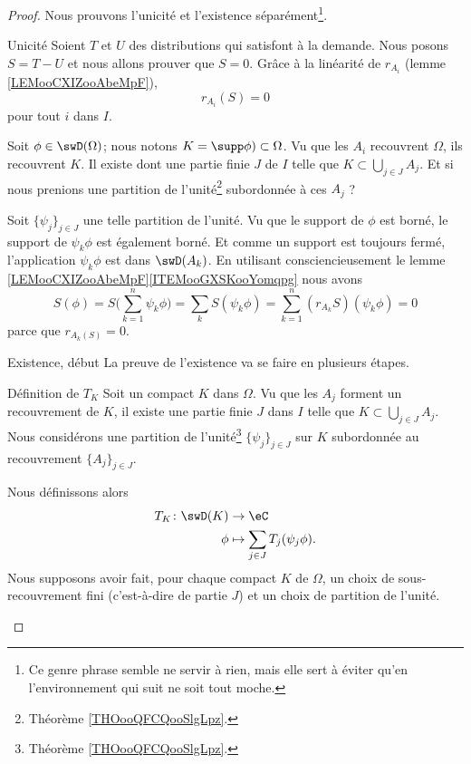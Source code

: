 \begin{proof}
    Nous prouvons l'unicité et l'existence séparément\footnote{Ce genre phrase semble ne servir à rien, mais elle sert à éviter qu'en l'environnement  qui suit ne soit tout moche.}.
    \begin{subproof}
    \item[Unicité]
        Soient \( T\) et \( U\) des distributions qui satisfont à la demande. Nous posons \( S=T-U\) et nous allons prouver que \( S=0\). Grâce à la linéarité de \( r_{A_i}\) (lemme \ref{LEMooCXIZooAbeMpF}),
        \begin{equation}
            r_{A_i}(S)=0
        \end{equation}
        pour tout \( i\) dans \( I\).

        Soit \( \phi\in \swD(\Omega)\); nous notons \( K=\supp\phi)\subset\Omega\). Vu que les \( A_i\) recouvrent \( \Omega\), ils recouvrent \( K\). Il existe dont une partie finie \( J\) de \( I\) telle que \( K\subset\bigcup_{j\in J}A_j\). Et si nous prenions une partition de l'unité\footnote{Théorème \ref{THOooQFCQooSlgLpz}.} subordonnée à ces \( A_j\) ?

        Soit \( \{ \psi_j \}_{j\in J}\) une telle partition de l'unité. Vu que le support de \( \phi\) est borné, le support de \( \psi_k\phi\) est également borné. Et comme un support est toujours fermé, l'application \( \psi_k\phi\) est dans \( \swD(A_k)\). En utilisant consciencieusement le lemme \ref{LEMooCXIZooAbeMpF}\ref{ITEMooGXSKooYomqpg} nous avons
        \begin{equation}
            S(\phi)=S\big( \sum_{k=1}^n\psi_k\phi \big)=\sum_kS(\psi_k\phi)=\sum_{k=1}^n(r_{A_k}S)(\psi_k\phi)=0
        \end{equation}
        parce que \( r_{A_k(S)}=0\).
    \item[Existence, début]
        La preuve de l'existence va se faire en plusieurs étapes.

    \item[Définition de $T_K$]
        Soit un compact \( K\) dans \( \Omega\). Vu que les \( A_j\) forment un recouvrement de \( K\), il existe une partie finie \( J\) dans \( I\) telle que \( K\subset\bigcup_{j\in J}A_j\). Nous considérons une partition de l'unité\footnote{Théorème \ref{THOooQFCQooSlgLpz}.} \( \{ \psi_j \}_{j\in J}\) sur \( K\) subordonnée au recouvrement \( \{ A_j \}_{j\in J}\).

        Nous définissons alors
        \begin{equation}
            \begin{aligned}
                T_K\colon \swD(K)&\to \eC \\
                \phi&\mapsto \sum_{j\in J}T_j(\psi_j\phi). 
            \end{aligned}
        \end{equation}
        Nous supposons avoir fait, pour chaque compact \( K\) de \( \Omega\), un choix de sous-recouvrement fini (c'est-à-dire de partie \( J\)) et un choix de partition de l'unité.


\end{subproof}
\end{proof}
